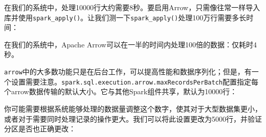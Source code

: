 \documentclass[
]{article}
\newenvironment{Shaded}{\begin{snugshade}}{\end{snugshade}}
\newcommand{\CommentTok}[1]{\textcolor[rgb]{0.56,0.35,0.01}{\textit{#1}}}
\newcommand{\DecValTok}[1]{\textcolor[rgb]{0.00,0.00,0.81}{#1}}
\newcommand{\FloatTok}[1]{\textcolor[rgb]{0.00,0.00,0.81}{#1}}
\newcommand{\KeywordTok}[1]{\textcolor[rgb]{0.13,0.29,0.53}{\textbf{#1}}}
\newcommand{\NormalTok}[1]{#1}
\newcommand{\OperatorTok}[1]{\textcolor[rgb]{0.81,0.36,0.00}{\textbf{#1}}}
\newcommand{\StringTok}[1]{\textcolor[rgb]{0.31,0.60,0.02}{#1}}
\begin{document}
在我们的系统中，处理10000行大约需要8秒。要启用Arrow，只需像往常一样导入库并使用\texttt{spark\_apply()}。让我们测一下\texttt{spark\_apply()}处理100万行需要多长时间：

\begin{Shaded}
\end{Shaded}

在我们的系统中，Apache
Arrow可以在一半的时间内处理100倍的数据：仅耗时4秒。

\texttt{arrow}中的大多数功能只是在后台工作，可以提高性能和数据序列化；但是，有一个设置需要注意。\texttt{spark.sql.execution.arrow.maxRecordsPerBatch}配置指定每个arrow数据传输的默认大小。它与其他Spark组件共享，默认为10000行：

\begin{Shaded}
\end{Shaded}

你可能需要根据系统能够处理的数据量调整这个数字，使其对于大型数据集更小，或者对于需要同时处理记录的操作更大。我们可以将此设置更改为5000行，并验证分区是否也正确更改：
\end{document}
